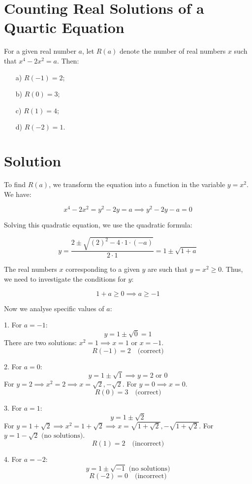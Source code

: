 \documentclass{article}
\begin{document}
\section{Counting Real Solutions of a Quartic Equation}

For a given real number $a$, let $R(a)$ denote the number of real numbers $x$ such that $x^4 - 2x^2 = a$. Then:
\begin{itemize}
\item[a)] $R(-1) = 2$;
\item[b)] $R(0) = 3$;
\item[c)] $R(1) = 4$;
\item[d)] $R(-2) = 1$.
\end{itemize}

\section{Solution}

To find $R(a)$, we transform the equation into a function in the variable $y = x^2$. We have:

\[
x^4 - 2x^2 = y^2 - 2y = a \implies y^2 - 2y - a = 0
\]

Solving this quadratic equation, we use the quadratic formula:

\[
y = \frac{2 \pm \sqrt{(2)^2 - 4 \cdot 1 \cdot (-a)}}{2 \cdot 1} = 1 \pm \sqrt{1 + a}
\]

The real numbers $x$ corresponding to a given $y$ are such that $y = x^2 \geq 0$. Thus, we need to investigate the conditions for $y$:

\[
1 + a \geq 0 \implies a \geq -1
\]

Now we analyse specific values of $a$:

1. For $a = -1$:
\[
y = 1 \pm \sqrt{0} = 1
\]
There are two solutions: $x^2 = 1 \implies x = 1$ or $x = -1$.
\[
R(-1) = 2 \quad \text{(correct)}
\]

2. For $a = 0$:
\[
y = 1 \pm \sqrt{1} \implies y = 2 \text{ or } 0
\]
For $y = 2 \implies x^2 = 2 \implies x = \sqrt{2}, -\sqrt{2}$.
For $y = 0 \implies x = 0$.
\[
R(0) = 3 \quad \text{(correct)}
\]

3. For $a = 1$:
\[
y = 1 \pm \sqrt{2}
\]
For $y = 1 + \sqrt{2} \implies x^2 = 1 + \sqrt{2} \implies x = \sqrt{1+\sqrt{2}}, -\sqrt{1+\sqrt{2}}$.
For $y = 1 - \sqrt{2} \text{ (no solutions)}$.
\[
R(1) = 2 \quad \text{(incorrect)}
\]

4. For $a = -2$:
\[
y = 1 \pm \sqrt{-1} \text{ (no solutions)}
\]
\[
R(-2) = 0 \quad \text{(incorrect)}
\]
\end{document}
